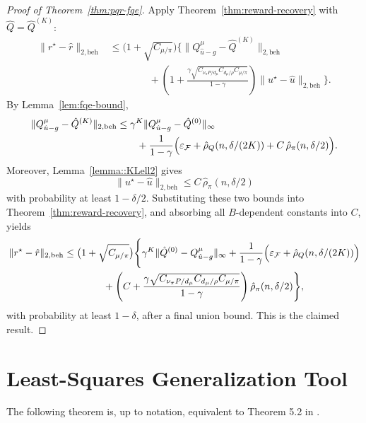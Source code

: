 \begin{proof}[Proof of Theorem~\ref{thm:pqr-fqe}]
Apply Theorem~\ref{thm:reward-recovery} with \(\hat Q=\hat Q^{(K)}\):
\begin{align*}
\|r^\star-\hat r\|_{2,\mathrm{beh}}
&\le
\bigl(1+\sqrt{C_{\mu/\pi}}\bigr)
\Bigg\{
\|Q^\mu_{\hat u-g}-\hat Q^{(K)}\|_{2,\mathrm{beh}}\\
&\qquad\qquad+
\left(
1+\frac{\gamma\sqrt{C_{\nu_\pi P/d_\mu}C_{d_\mu/\rho}C_{\mu/\pi}}}{1-\gamma}
\right)
\|u^\star-\hat u\|_{2,\mathrm{beh}}
\Bigg\}.
\end{align*}
By Lemma~\ref{lem:fqe-bound},
\begin{align*}
\|Q^\mu_{\hat u-g}-\hat Q^{(K)}\|_{2,\mathrm{beh}}
&\le
\gamma^K\|Q^\mu_{\hat u-g}-\hat Q^{(0)}\|_{\infty}\\
&\qquad+
\frac{1}{1-\gamma}
\Bigl(
\varepsilon_{\mathcal F}
+\hat\rho_Q(n,\delta/(2K))
+ C\,\hat\rho_\pi(n,\delta/2)
\Bigr).
\end{align*}
Moreover, Lemma~\ref{lemma::KLell2} gives
\[
\|u^\star-\hat u\|_{2,\mathrm{beh}}
\le
C\,\hat\rho_\pi(n,\delta/2)
\]
with probability at least \(1-\delta/2\). Substituting these two bounds into
Theorem~\ref{thm:reward-recovery}, and absorbing all \(B\)-dependent constants
into \(C\), yields
\begin{align*}
\|r^\star-\hat r\|_{2,\mathrm{beh}}
&\le
\bigl(1+\sqrt{C_{\mu/\pi}}\bigr)
\Bigg\{
\gamma^K\|\hat Q^{(0)}-Q^\mu_{\hat u-g}\|_{\infty}
+
\frac{1}{1-\gamma}
\Bigl(
\varepsilon_{\mathcal F}
+\hat\rho_Q(n,\delta/(2K))
\Bigr)\\
&\qquad\qquad+
\left(
C
+\frac{\gamma\sqrt{C_{\nu_\pi P/d_{\mu}}C_{d_\mu/\rho}C_{\mu/\pi}}}{1-\gamma}
\right)
\hat\rho_\pi(n,\delta/2)
\Bigg\},
\end{align*}
with probability at least \(1-\delta\), after a final union bound. This is the
claimed result.
\end{proof}

\section{Least-Squares Generalization Tool}
\label{appendix::LSE}

The following theorem is, up to notation, equivalent to Theorem 5.2 in
\cite{koltchinskii2011oracle}.

